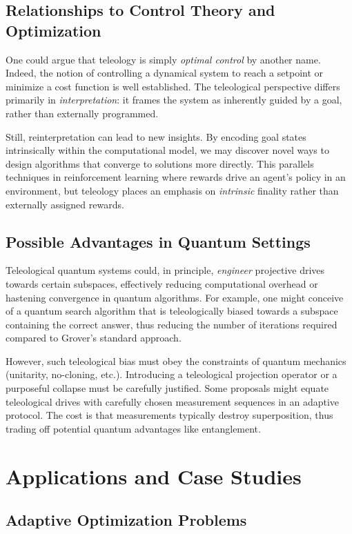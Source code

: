 \documentclass[12pt]{article}
\begin{document}
\subsection{Relationships to Control Theory and Optimization}

One could argue that teleology is simply \emph{optimal control} by another name. Indeed, the notion of controlling a dynamical system to reach a setpoint or minimize a cost function is well established. The teleological perspective differs primarily in \emph{interpretation}: it frames the system as inherently guided by a goal, rather than externally programmed. 

Still, reinterpretation can lead to new insights. By encoding goal states intrinsically within the computational model, we may discover novel ways to design algorithms that converge to solutions more directly. This parallels techniques in reinforcement learning where rewards drive an agent's policy in an environment, but teleology places an emphasis on \emph{intrinsic} finality rather than externally assigned rewards.

\subsection{Possible Advantages in Quantum Settings}

Teleological quantum systems could, in principle, \emph{engineer} projective drives towards certain subspaces, effectively reducing computational overhead or hastening convergence in quantum algorithms. For example, one might conceive of a quantum search algorithm that is teleologically biased towards a subspace containing the correct answer, thus reducing the number of iterations required compared to Grover's standard approach. 

However, such teleological bias must obey the constraints of quantum mechanics (unitarity, no-cloning, etc.). Introducing a teleological projection operator or a purposeful collapse must be carefully justified. Some proposals might equate teleological drives with carefully chosen measurement sequences in an adaptive protocol. The cost is that measurements typically destroy superposition, thus trading off potential quantum advantages like entanglement.

\section{Applications and Case Studies}

\subsection{Adaptive Optimization Problems}
\end{document}
